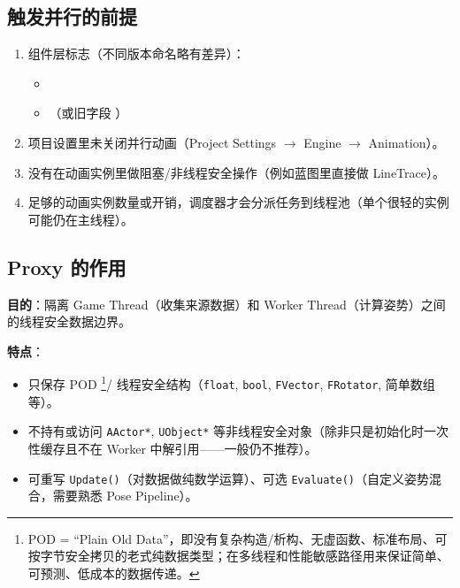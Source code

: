 \documentclass[10pt,openright,oneside,CJKmath]{MyBook}
\begin{document}
\subsection{触发并行的前提}
\begin{enumerate}
  \item 组件层标志（不同版本命名略有差异）：
  \begin{itemize}
    \item {}
    \item {}（或旧字段 ）
  \end{itemize}
  \item 项目设置里未关闭并行动画（Project Settings $\rightarrow$ Engine $\rightarrow$ Animation）。
  \item 没有在动画实例里做阻塞/非线程安全操作（例如蓝图里直接做 LineTrace）。
  \item 足够的动画实例数量或开销，调度器才会分派任务到线程池（单个很轻的实例可能仍在主线程）。
\end{enumerate}

\subsection{Proxy 的作用}
\textbf{目的}：隔离 Game Thread（收集来源数据）和 Worker Thread（计算姿势）之间的线程安全数据边界。  

\textbf{特点}：
\begin{itemize}
  \item 只保存 POD \footnote{POD = “Plain Old Data”，即没有复杂构造/析构、无虚函数、标准布局、可按字节安全拷贝的老式纯数据类型；在多线程和性能敏感路径用来保证简单、可预测、低成本的数据传递。}/ 线程安全结构（\texttt{float}, \texttt{bool}, \texttt{FVector}, \texttt{FRotator}, 简单数组等）。
  \item 不持有或访问 \texttt{AActor*}, \texttt{UObject*} 等非线程安全对象（除非只是初始化时一次性缓存且不在 Worker 中解引用——一般仍不推荐）。
  \item 可重写 \texttt{Update()}（对数据做纯数学运算）、可选 \texttt{Evaluate()}（自定义姿势混合，需要熟悉 Pose Pipeline）。
\end{itemize}
\end{document}
